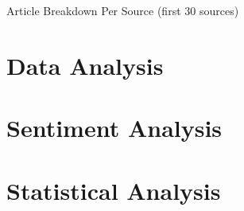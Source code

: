 \begin{table}[htb]
\caption{Article Breakdown Per Source (first 30 sources)}
\label{tab:article stat source}
\centering
{}
\end{table}

\section{Data Analysis}

\section{Sentiment Analysis}

\section{Statistical Analysis}
